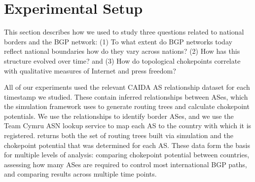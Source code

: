 \section{Experimental Setup}
\label{sec:exp}


This section describes how we used \toolname{} to study three questions related to national borders and the BGP network:
(1) To
what extent do BGP networks today reflect national boundaries
how do they vary across nations? (2) How has this structure evolved
over time? and (3) How do topological chokepoints correlate with
qualitative measures of Internet and press freedom?

All of our experiments used the relevant CAIDA AS relationship dataset for 
each timestamp we studied.  These contain inferred relationships
between ASes, which the simulation framework uses to
generate routing trees and  calculate chokepoint potentials.
We use the relationships to identify border ASes, and
we use the Team Cymru ASN lookup service to map each AS to the country
with which it is registered. \toolname{} returns both the set of
routing trees built via simulation and the chokepoint potential that
was determined for each AS. These data form the basis for
multiple levels of analysis: comparing chokepoint potential between countries,
assessing how many ASes are required to control most international BGP paths, 
and comparing results across multiple time points.

